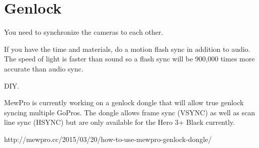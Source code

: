 \chapter{Genlock}
\pagecolor{white}
\label{chap:24}
\begin{fullwidth}


\problem

{\large You need to synchronize the cameras to each other. 

 \par}

If you have the time and materials, do a motion flash sync in addition to audio. The speed of light is faster than sound so a flash sync will be 900,000 times more accurate than audio sync. 
\solution

{\large DIY.

 \par}

MewPro is currently working on a genlock dongle that will allow true genlock syncing multiple GoPros. The dongle allows frame sync (VSYNC) as well as scan line sync (HSYNC) but are only available for the Hero 3+ Black currently. 

http://mewpro.cc/2015/03/20/how-to-use-mewpro-genlock-dongle/

\clearpage
\end{fullwidth}
